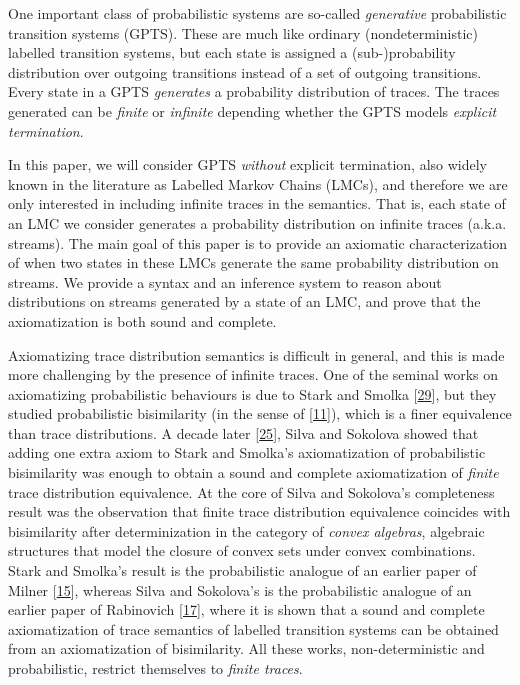 \par\medskip
\hypertarget{html:S1.p2}{} One important class of probabilistic systems are so-called \emph{generative} probabilistic transition systems (GPTS). These are much like ordinary (nondeterministic) labelled transition systems, but each state is assigned a (sub-)probability distribution over outgoing transitions instead of a set of outgoing transitions. Every state in a GPTS \emph{generates} a probability distribution of traces. The traces generated can be \emph{finite} or \emph{infinite} depending whether the GPTS models \emph{explicit termination}.
\par\medskip
\hypertarget{html:S1.p3}{} In this paper, we will consider GPTS \emph{without} explicit termination, also widely known in the literature as Labelled Markov Chains (LMCs), and therefore we are only interested in including infinite traces in the semantics. That is, each state of an LMC we consider generates a probability distribution on infinite traces (a.k.a. streams). The main goal of this paper is to provide an axiomatic characterization of when two states in these LMCs generate the same probability distribution on streams. We provide a syntax and an inference system to reason about distributions on streams generated by a state of an LMC, and prove that the axiomatization is both sound and complete.
\par\medskip
\hypertarget{html:S1.p4}{} Axiomatizing trace distribution semantics is difficult in general, and this is made more challenging by the presence of infinite traces. One of the seminal works on axiomatizing probabilistic behaviours is due to Stark and Smolka [\hyperlink{html:bib.bib29}{29}], but they studied probabilistic bisimilarity (in the sense of [\hyperlink{html:bib.bib11}{11}]), which is a finer equivalence than trace distributions. A decade later [\hyperlink{html:bib.bib25}{25}], Silva and Sokolova showed that adding one extra axiom to Stark and Smolka’s axiomatization of probabilistic bisimilarity was enough to obtain a sound and complete axiomatization of \emph{finite} trace distribution equivalence. At the core of Silva and Sokolova’s completeness result was the observation that finite trace distribution equivalence coincides with bisimilarity after determinization in the category of \emph{convex algebras}, algebraic structures that model the closure of convex sets under convex combinations. Stark and Smolka’s result is the probabilistic analogue of an earlier paper of Milner [\hyperlink{html:bib.bib15}{15}], whereas Silva and Sokolova’s is the probabilistic analogue of an earlier paper of Rabinovich [\hyperlink{html:bib.bib17}{17}], where it is shown that a sound and complete axiomatization of trace semantics of labelled transition systems can be obtained from an axiomatization of bisimilarity. All these works, non-deterministic and probabilistic, restrict themselves to \emph{finite traces}.
